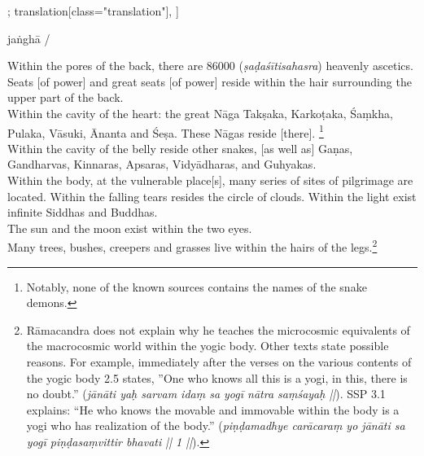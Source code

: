\begin{alignment}[
  texts=edition[class="edition"];
  translation[class="translation"],
  ]
\begin{edition}
\begin{prose}[p41_02]
{  
  }
jaṅghā
/
    \end{prose}
  \end{edition}
  \begin{translation}
    \begin{tlate}[p41_02]
      \noindent
Within the pores of the back, there are 86000 (\textit{ṣaḍaśītisahasra}) heavenly ascetics. Seats [of power] and great seats [of power] reside within the hair surrounding the upper part of the back.\\

Within the cavity of the heart: the great Nāga Takṣaka, Karkoṭaka, Śaṃkha, Pulaka, Vāsuki, Ānanta and Śeṣa. These Nāgas reside [there]. \footnote{Notably, none of the known sources contains the names of the snake demons.}\\

Within the cavity of the belly reside other snakes, [as well as] Gaṇas, Gandharvas, Kinnaras, Apsaras, Vidyādharas, and Guhyakas.\\

Within the body, at the vulnerable place[s], many series of sites of pilgrimage are located. Within the falling tears resides the circle of clouds. Within the light exist infinite Siddhas and Buddhas.\\

The sun and the moon exist within the two eyes.\\

Many trees, bushes, creepers and grasses live within the hairs of the legs.\footnote{Rāmacandra does not explain why he teaches the microcosmic equivalents of the macrocosmic world within the yogic body. Other texts state possible reasons. For example, immediately after the verses on the various contents of the yogic body  2.5 states, ''One who knows all this is a yogi, in this, there is no doubt.'' (\textit{jānāti yaḥ sarvam idaṃ sa yogī nātra saṃśayaḥ ||}). SSP 3.1 explains: ``He who knows the movable and immovable within the body is a yogi who has realization of the body.'' (\textit{piṇḍamadhye carācaraṃ yo jānāti sa yogī piṇḍasaṃvittir bhavati || 1 ||}).}
\flushpage
    \end{tlate}
  \end{translation}
\end{alignment}
